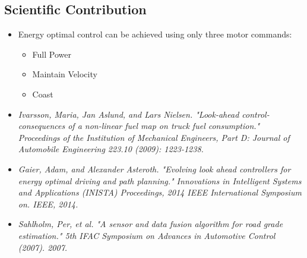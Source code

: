 \documentclass[paper=a4, fontsize=11pt]{scrartcl} %
\numberwithin{equation}{section} %
\numberwithin{figure}{section} %
\numberwithin{table}{section} %
\begin{document}
\subsection{Scientific Contribution}
\begin{itemize}
	\item Energy optimal control can be achieved using only three motor commands:
	\begin{itemize}
		\item Full Power
		\item Maintain Velocity
		\item Coast
	\end{itemize}	 
		\item \textit{Ivarsson, Maria, Jan Aslund, and Lars Nielsen. "Look-ahead control-consequences of a non-linear fuel map on truck fuel consumption." Proceedings of the Institution of Mechanical Engineers, Part D: Journal of Automobile Engineering 223.10 (2009): 1223-1238.}
		\item \textit{Gaier, Adam, and Alexander Asteroth. "Evolving look ahead controllers for energy optimal driving and path planning." Innovations in Intelligent Systems and Applications (INISTA) Proceedings, 2014 IEEE International Symposium on. IEEE, 2014.}
		\item \textit{Sahlholm, Per, et al. "A sensor and data fusion algorithm for road grade estimation." 5th IFAC Symposium on Advances in Automotive Control (2007). 2007.}
\end{itemize}
\end{document}
